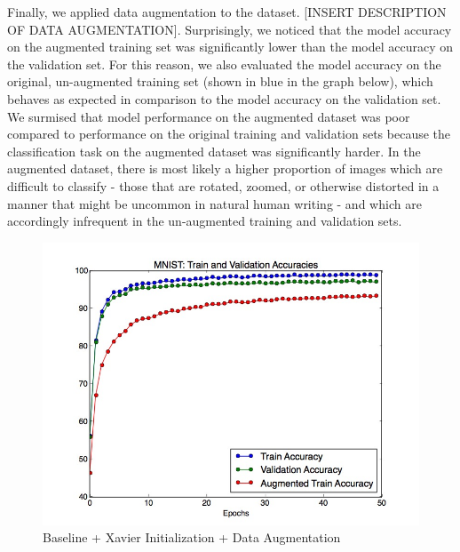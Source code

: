 \documentclass[a4paper]{article}
\begin{document}
\begin{enumerate}
{Finally, we applied data augmentation to the dataset. [INSERT DESCRIPTION OF DATA AUGMENTATION]. 
\newline
\newline
Surprisingly, we noticed that the model accuracy on the augmented training set was significantly lower than the model accuracy on the validation set. For this reason, we also evaluated the model accuracy on the original, un-augmented training set (shown in blue in the graph below), which behaves as expected in comparison to the model accuracy on the validation set. We surmised that model performance on the augmented dataset was poor compared to performance on the original training and validation sets because the classification task on the augmented dataset was significantly harder. In the augmented dataset, there is most likely a higher proportion of images which are difficult to classify - those that are rotated, zoomed, or otherwise distorted in a manner that might be uncommon in natural human writing - and which are accordingly infrequent in the un-augmented training and validation sets. 

\begin{figure}
  \includegraphics[width=12cm]{../plots/accuracies_augmented.jpg}
  \centering
  \caption{Baseline + Xavier Initialization + Data Augmentation}
  \label{fig:boat1}
\end{figure}

}
\end{enumerate}
\end{document}
